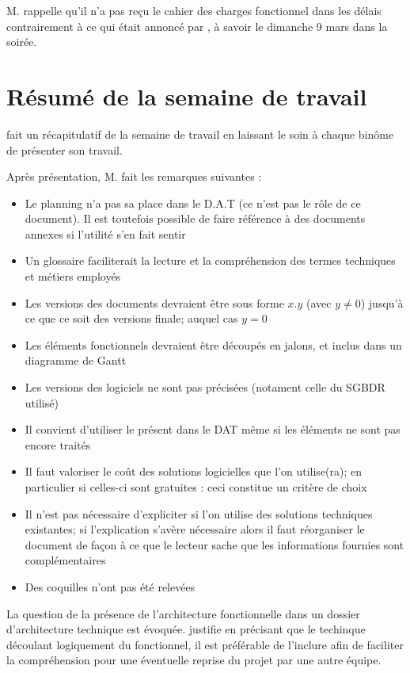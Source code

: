 \documentclass[11pt,fleqn]{report}
\begin{document}
M. \Agopian rappelle qu'il n'a pas reçu le cahier des charges fonctionnel dans les délais contrairement à ce qui était annoncé par \amo, à savoir le dimanche 9 mars dans la soirée.

\section{Résumé de la semaine de travail}

\amo fait un récapitulatif de la semaine de travail en laissant le soin à chaque binôme de présenter son travail.

Après présentation, M. \Agopian fait les remarques suivantes :
\begin{itemize}
    \item Le planning n'a pas sa place dans le D.A.T (ce n'est pas le rôle de ce document). Il est toutefois possible de faire référence à des documents annexes si l'utilité s'en fait sentir
    \item Un glossaire faciliterait la lecture et la compréhension des termes techniques et métiers employés
    \item Les versions des documents devraient être sous forme $x$.$y$ (avec $y\ne0$) jusqu'à ce que ce soit des versions finale; auquel cas $y=0$
    \item Les éléments fonctionnels devraient être découpés en jalons, et inclus dans un diagramme de Gantt
    \item Les versions des logiciels ne sont pas précisées (notament celle du SGBDR utilisé)
    \item Il convient d'utiliser le présent dans le DAT même si les éléments ne sont pas encore traités
    \item Il faut valoriser le coût des solutions logicielles que l'on utilise(ra); en particulier si celles-ci sont gratuites : ceci constitue un critère de choix
    \item Il n'est pas nécessaire d'expliciter si l'on utilise des solutions techniques existantes; si l'explication s'avère nécessaire alors il faut réorganiser le document de façon à ce que le lecteur sache que les informations fournies sont complémentaires
    \item Des coquilles n'ont pas été relevées\\
\end{itemize}
La question de la présence de l'architecture fonctionnelle dans un dossier d'architecture technique est évoquée. \amo justifie en précisant que le techinque découlant logiquement du fonctionnel, il est préférable de l'inclure afin de faciliter la compréhension pour une éventuelle reprise du projet par une autre équipe.
\end{document}

